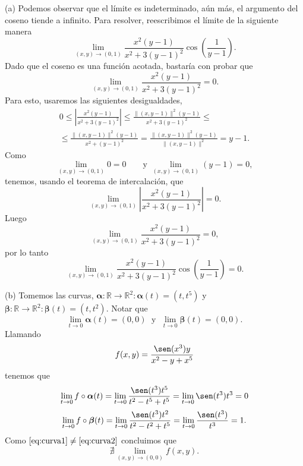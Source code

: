 \begin{solution}
    (a) Podemos observar que el límite es indeterminado, aún más, el argumento del coseno tiende a infinito. Para resolver, reescribimos el límite de la siguiente manera
    \[
        \lim_{(x,y)\to(0,1)} \frac{x^2(y-1)}{x^2+3(y-1)^2}\cos\left(\frac{1}{y-1}\right).
    \]
    Dado que el coseno es una función acotada,  bastaría con probar que $$ \lim_{(x,y)\to(0,1)} \frac{x^2(y-1)}{x^2+3(y-1)^2}=0.$$
    Para esto, usaremos las siguientes desigualdades,
    \begin{gather*}
        0 \leq \left|\frac{x^2(y-1)}{x^2+3(y-1)^2}\right| \leq \frac{\|(x,y-1)\|^2(y-1)}{x^2+3(y-1)^2}\leq\\[.2cm]
        \leq
        \frac{\|(x,y-1)\|^2(y-1)}{x^2+(y-1)^2} = \frac{\|(x,y-1)\|^2(y-1)}{\|(x,y-1)\|^2} = y-1.
    \end{gather*}
    Como  $$\lim_{(x,y)\to(0,1)} 0 = 0 \;\;\;\;\;\;\mbox{ y } \lim_{(x,y)\to(0,1)} (y-1) = 0, $$
    tenemos, usando el teorema de intercalaci\'on, que
    $$ \lim_{(x,y)\to(0,1)} \left|\frac{x^2(y-1)}{x^2+3(y-1)^2}\right| = 0.$$
    Luego  $$ \lim_{(x,y)\to(0,1)} \frac{x^2(y-1)}{x^2+3(y-1)^2}=0,$$ por lo tanto $$\lim_{(x,y)\to(0,1)} \frac{x^2(y-1)}{x^2+3(y-1)^2}\cos\left(\frac{1}{y-1}\right) = 0.$$


    (b) Tomemos  las curvas,  $\boldsymbol{\alpha}:\mathbb{R}\to\mathbb{R}^2:  \boldsymbol{\alpha}(t)=(t,t^5)$  \; y \;  $\boldsymbol{\beta}:\mathbb{R}\to\mathbb{R}^2: \boldsymbol{\beta}(t)=(t,t^2)$. Notar que $$\lim_{t\to0}\boldsymbol{\alpha}(t)=(0,0)  \; \mbox{ y } \;   \lim_{t\to0}\boldsymbol{\beta}(t)=(0,0).$$
    Llamando  $$f(x,y) = \frac{\sen(x^3)y}{x^2-y+x^5}$$ tenemos que
    \begin{equation}
        \lim_{t\to0}f\circ\boldsymbol{\alpha}(t) = \lim_{t\to0}\frac{\sen(t^3)t^5}{t^2-t^5+t^5} = \lim_{t\to0}\sen(t^3)t^3 = 0 \label{eq:curva1}
    \end{equation}
    \begin{equation}
        \lim_{t\to0}f\circ\boldsymbol{\beta}(t) = \lim_{t\to0}\frac{\sen(t^3)t^2}{t^2-t^2+t^5} = \lim_{t\to0}\frac{\sen(t^3)}{t^3} = 1. \label{eq:curva2}
    \end{equation}
    Como \; $\eqref{eq:curva1} \neq \eqref{eq:curva2}$
    concluimos  que $$ \nexists\lim_{(x,y)\to(0,0)}
        f(x,y).$$
\end{solution}


